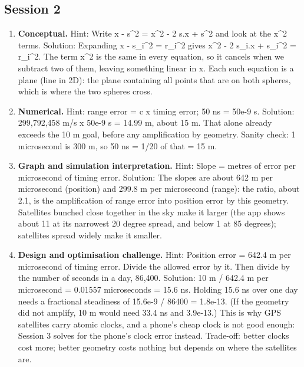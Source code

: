 \documentclass[11pt,a4paper]{article}
\begin{document}
\subsection*{Session 2}
\begin{enumerate}[nosep]
\item \textbf{Conceptual.} Hint: Write \textbar{}x - s\textbar{}\textasciicircum{}2 = \textbar{}x\textbar{}\textasciicircum{}2 - 2 s.x + \textbar{}s\textbar{}\textasciicircum{}2 and look at the \textbar{}x\textbar{}\textasciicircum{}2 terms. Solution: Expanding \textbar{}x - s\_i\textbar{}\textasciicircum{}2 = r\_i\textasciicircum{}2 gives \textbar{}x\textbar{}\textasciicircum{}2 - 2 s\_i.x + \textbar{}s\_i\textbar{}\textasciicircum{}2 = r\_i\textasciicircum{}2. The term \textbar{}x\textbar{}\textasciicircum{}2 is the same in every equation, so it cancels when we subtract two of them, leaving something linear in x. Each such equation is a plane (line in 2D): the plane containing all points that are on both spheres, which is where the two spheres cross.
\item \textbf{Numerical.} Hint: range error = c x timing error; 50 ns = 50e-9 s. Solution: 299,792,458 m/s x 50e-9 s = 14.99 m, about 15 m. That alone already exceeds the 10 m goal, before any amplification by geometry. Sanity check: 1 microsecond is 300 m, so 50 ns = 1/20 of that = 15 m.
\item \textbf{Graph and simulation interpretation.} Hint: Slope = metres of error per microsecond of timing error. Solution: The slopes are about 642 m per microsecond (position) and 299.8 m per microsecond (range): the ratio, about 2.1, is the amplification of range error into position error by this geometry. Satellites bunched close together in the sky make it larger (the app shows about 11 at its narrowest 20 degree spread, and below 1 at 85 degrees); satellites spread widely make it smaller.
\item \textbf{Design and optimisation challenge.} Hint: Position error = 642.4 m per microsecond of timing error. Divide the allowed error by it. Then divide by the number of seconds in a day, 86,400. Solution: 10 m / 642.4 m per microsecond = 0.01557 microseconds = 15.6 ns. Holding 15.6 ns over one day needs a fractional steadiness of 15.6e-9 / 86400 = 1.8e-13. (If the geometry did not amplify, 10 m would need 33.4 ns and 3.9e-13.) This is why GPS satellites carry atomic clocks, and a phone's cheap clock is not good enough: Session 3 solves for the phone's clock error instead. Trade-off: better clocks cost more; better geometry costs nothing but depends on where the satellites are.
\end{enumerate}
\end{document}

